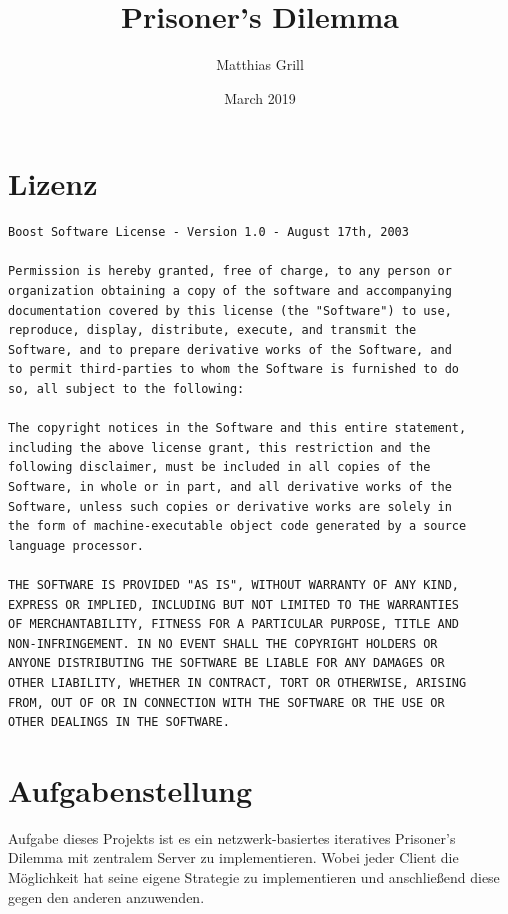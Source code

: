 \documentclass[12pt, letterpaper]{article}
\title{Prisoner's Dilemma}
\author{Matthias Grill}
\date{March 2019}
\begin{document}
	
\maketitle
\newpage

\tableofcontents
\newpage


\section{Lizenz}
\begin{Verbatim}
Boost Software License - Version 1.0 - August 17th, 2003

Permission is hereby granted, free of charge, to any person or
organization obtaining a copy of the software and accompanying
documentation covered by this license (the "Software") to use,
reproduce, display, distribute, execute, and transmit the
Software, and to prepare derivative works of the Software, and
to permit third-parties to whom the Software is furnished to do
so, all subject to the following:

The copyright notices in the Software and this entire statement,
including the above license grant, this restriction and the
following disclaimer, must be included in all copies of the
Software, in whole or in part, and all derivative works of the
Software, unless such copies or derivative works are solely in
the form of machine-executable object code generated by a source
language processor.

THE SOFTWARE IS PROVIDED "AS IS", WITHOUT WARRANTY OF ANY KIND,
EXPRESS OR IMPLIED, INCLUDING BUT NOT LIMITED TO THE WARRANTIES
OF MERCHANTABILITY, FITNESS FOR A PARTICULAR PURPOSE, TITLE AND
NON-INFRINGEMENT. IN NO EVENT SHALL THE COPYRIGHT HOLDERS OR
ANYONE DISTRIBUTING THE SOFTWARE BE LIABLE FOR ANY DAMAGES OR
OTHER LIABILITY, WHETHER IN CONTRACT, TORT OR OTHERWISE, ARISING
FROM, OUT OF OR IN CONNECTION WITH THE SOFTWARE OR THE USE OR
OTHER DEALINGS IN THE SOFTWARE.
\end{Verbatim}

\clearpage

\normalsize

\newpage

\section{Aufgabenstellung}
Aufgabe dieses Projekts ist es ein netzwerk-basiertes iteratives Prisoner's Dilemma mit zentralem Server zu implementieren. Wobei jeder Client die Möglichkeit hat seine eigene Strategie zu implementieren und anschließend diese gegen den anderen anzuwenden.
\end{document}
